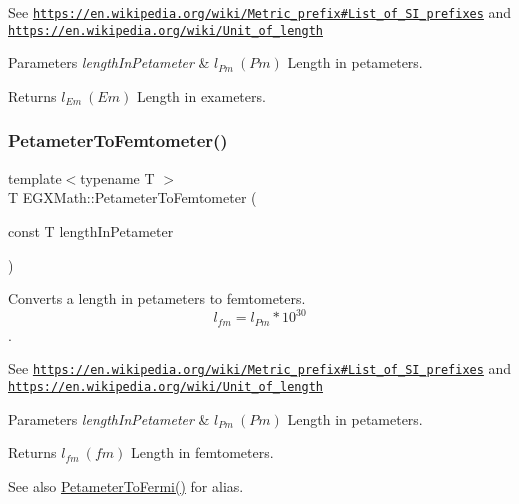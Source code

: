 See \href{https://en.wikipedia.org/wiki/Metric_prefix#List_of_SI_prefixes}{\tt https\+://en.\+wikipedia.\+org/wiki/\+Metric\+\_\+prefix\#\+List\+\_\+of\+\_\+\+S\+I\+\_\+prefixes} and \href{https://en.wikipedia.org/wiki/Unit_of_length}{\tt https\+://en.\+wikipedia.\+org/wiki/\+Unit\+\_\+of\+\_\+length} 
\begin{DoxyParams}{Parameters}
{\em length\+In\+Petameter} & $ l_{Pm}\ (Pm)$ Length in petameters. \\
\hline
\end{DoxyParams}
\begin{DoxyReturn}{Returns}
$ l_{Em}\ (Em)$ Length in exameters. 
\end{DoxyReturn}
\mbox{\label{group___e_g_x_math-_conversions-_length_conversions-_s_i-_petameter-_s_i_ga295c384b3674727367d592d2b721fcd2}} 
\subsubsection{\texorpdfstring{Petameter\+To\+Femtometer()}{PetameterToFemtometer()}}
{\footnotesize\ttfamily template$<$typename T $>$ \\
T E\+G\+X\+Math\+::\+Petameter\+To\+Femtometer (\begin{DoxyParamCaption}\item[{const T}]{length\+In\+Petameter }\end{DoxyParamCaption})}



Converts a length in petameters to femtometers. \[ l_{fm}=l_{Pm} * 10^{30} \]. 

See \href{https://en.wikipedia.org/wiki/Metric_prefix#List_of_SI_prefixes}{\tt https\+://en.\+wikipedia.\+org/wiki/\+Metric\+\_\+prefix\#\+List\+\_\+of\+\_\+\+S\+I\+\_\+prefixes} and \href{https://en.wikipedia.org/wiki/Unit_of_length}{\tt https\+://en.\+wikipedia.\+org/wiki/\+Unit\+\_\+of\+\_\+length} 
\begin{DoxyParams}{Parameters}
{\em length\+In\+Petameter} & $ l_{Pm}\ (Pm)$ Length in petameters. \\
\hline
\end{DoxyParams}
\begin{DoxyReturn}{Returns}
$ l_{fm}\ (fm)$ Length in femtometers. 
\end{DoxyReturn}
\begin{DoxySeeAlso}{See also}
\mbox{\hyperlink{group___e_g_x_math-_conversions-_length_conversions-_s_i-_petameter-_non-_s_i_gaba0fd76c76316722eb49006d032fa493}{Petameter\+To\+Fermi()}} for alias. 
\end{DoxySeeAlso}
\mbox{\label{group___e_g_x_math-_conversions-_length_conversions-_s_i-_petameter-_s_i_ga421403e7220de552c73ae8e3e1edefd1}} 
